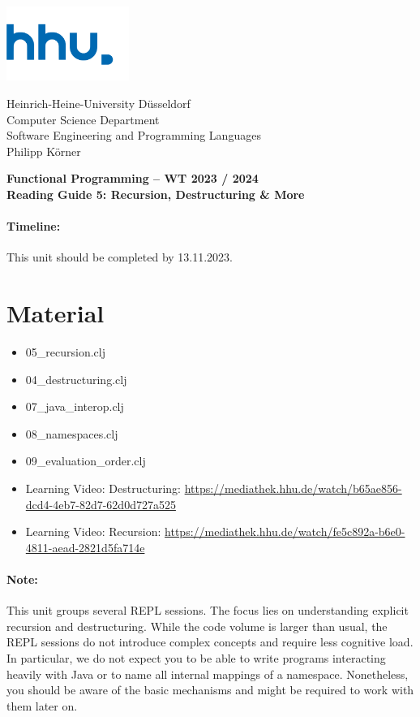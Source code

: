 \documentclass[11pt,a4paper]{article}
\begin{document}
	
	\begin{minipage}[b]{\textwidth}
		\parbox[t]{5cm}{%
			\includegraphics[width=4cm]{unilogo}
			\hfill
		}
		\parbox[b]{11cm}{%
			Heinrich-Heine-University D\"usseldorf\\
			Computer Science Department\\
			Software Engineering and Programming Languages\\
			Philipp K\"orner
		}
	\end{minipage}
\begin{center}
	\bf
	Functional Programming -- WT 2023 / 2024\\
    Reading Guide 5: Recursion, Destructuring \& More
\end{center}

\pagestyle{empty}

\paragraph{Timeline:} This unit should be completed by 13.11.2023.

\section{Material} 

\begin{itemize}
\item 05\_recursion.clj 
\item 04\_destructuring.clj
\item 07\_java\_interop.clj
\item 08\_namespaces.clj
\item 09\_evaluation\_order.clj
\item Learning Video: Destructuring: \url{https://mediathek.hhu.de/watch/b65ae856-dcd4-4eb7-82d7-62d0d727a525}
\item Learning Video: Recursion: \url{https://mediathek.hhu.de/watch/fe5c892a-b6e0-4811-aead-2821d5fa714e}
\end{itemize}

\paragraph{Note:} This unit groups several REPL sessions.
The focus lies on understanding explicit recursion and destructuring.
While the code volume is larger than usual,
the REPL sessions do not introduce complex concepts
and require less cognitive load.
In particular, we do not expect you to be able to write programs interacting heavily with Java
or to name all internal mappings of a namespace.
Nonetheless, you should be aware of the basic mechanisms
and might be required to work with them later on.
\end{document}
